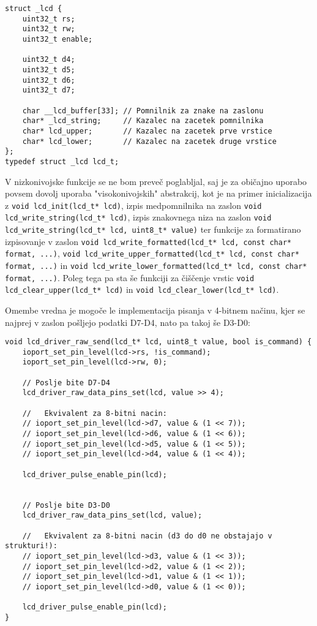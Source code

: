 \documentclass[12pt,a4paper,twoside,openright,slovene]{book}
\begin{document}
\begin{lstlisting}
struct _lcd {
    uint32_t rs;
    uint32_t rw;
    uint32_t enable;

    uint32_t d4;
    uint32_t d5;
    uint32_t d6;
    uint32_t d7;

    char __lcd_buffer[33]; // Pomnilnik za znake na zaslonu
    char* _lcd_string;     // Kazalec na zacetek pomnilnika
    char* lcd_upper;       // Kazalec na zacetek prve vrstice
    char* lcd_lower;       // Kazalec na zacetek druge vrstice
};
typedef struct _lcd lcd_t;
\end{lstlisting}

V nizkonivojske funkcije se ne bom preveč poglabljal, saj je za običajno uporabo povsem dovolj uporaba "visokonivojskih" abstrakcij, kot je na primer inicializacija z \lstinline{void lcd_init(lcd_t* lcd)}, izpis medpomnilnika na zaslon \lstinline{void lcd_write_string(lcd_t* lcd)}, izpis znakovnega niza na zaslon \lstinline{void lcd_write_string(lcd_t* lcd, uint8_t* value)} ter funkcije za formatirano izpisovanje v zaslon \lstinline{void lcd_write_formatted(lcd_t* lcd, const char* format, ...)}, \lstinline{void lcd_write_upper_formatted(lcd_t* lcd, const char* format, ...)} in \lstinline{void lcd_write_lower_formatted(lcd_t* lcd, const char* format, ...)}. Poleg tega pa sta še funkciji za čiščenje vrstic \lstinline{void lcd_clear_upper(lcd_t* lcd)} in \lstinline{void lcd_clear_lower(lcd_t* lcd)}.

Omembe vredna je mogoče le implementacija pisanja v 4-bitnem načinu, kjer se najprej v zaslon pošljejo podatki D7-D4, nato pa takoj še D3-D0:

\begin{lstlisting}
void lcd_driver_raw_send(lcd_t* lcd, uint8_t value, bool is_command) {
    ioport_set_pin_level(lcd->rs, !is_command);
    ioport_set_pin_level(lcd->rw, 0);

    // Poslje bite D7-D4
    lcd_driver_raw_data_pins_set(lcd, value >> 4);

    //   Ekvivalent za 8-bitni nacin:
    // ioport_set_pin_level(lcd->d7, value & (1 << 7));
    // ioport_set_pin_level(lcd->d6, value & (1 << 6));
    // ioport_set_pin_level(lcd->d5, value & (1 << 5));
    // ioport_set_pin_level(lcd->d4, value & (1 << 4));

    lcd_driver_pulse_enable_pin(lcd);


    // Poslje bite D3-D0
    lcd_driver_raw_data_pins_set(lcd, value);

    //   Ekvivalent za 8-bitni nacin (d3 do d0 ne obstajajo v strukturi!):
    // ioport_set_pin_level(lcd->d3, value & (1 << 3));
    // ioport_set_pin_level(lcd->d2, value & (1 << 2));
    // ioport_set_pin_level(lcd->d1, value & (1 << 1));
    // ioport_set_pin_level(lcd->d0, value & (1 << 0));

    lcd_driver_pulse_enable_pin(lcd);
}
\end{lstlisting}
\end{document}
